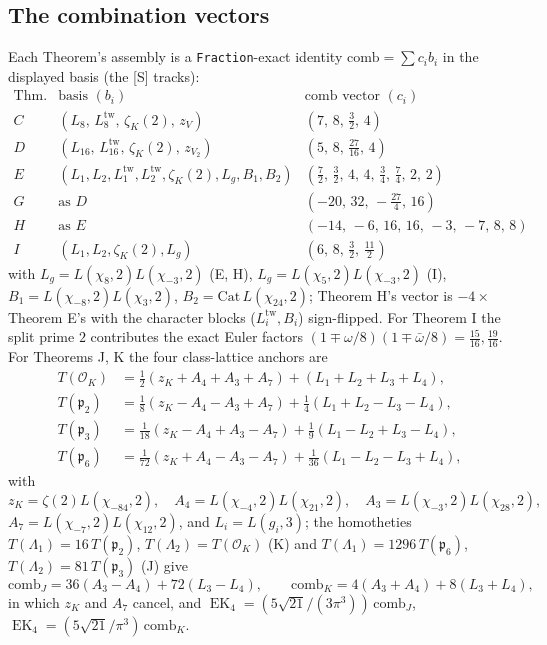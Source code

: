 \documentclass[11pt]{article}
\newcommand{\OO}{\mathcal{O}}
\DeclareMathOperator{\EK}{EK}
\theoremstyle{definition}
\theoremstyle{remark}
\begin{document}
\subsection{The combination vectors}\label{app:comb}

Each Theorem's assembly is a \texttt{Fraction}-exact identity
$\mathrm{comb}=\sum c_i b_i$ in the displayed basis (the [S] tracks):
\[
\begin{array}{c|l|l}
\text{Thm.} & \text{basis }(b_i) & \text{comb vector }(c_i)\\
\hline
C & (L_8,\,L_8^{\mathrm{tw}},\,\zeta_K(2),\,z_V) &
    (7,\,8,\,\tfrac32,\,4)\\
D & (L_{16},\,L_{16}^{\mathrm{tw}},\,\zeta_K(2),\,z_{V_2}) &
    (5,\,8,\,\tfrac{27}{16},\,4)\\
E & (L_1,L_2,L_1^{\mathrm{tw}},L_2^{\mathrm{tw}},\zeta_K(2),L_g,B_1,B_2)
  & (\tfrac72,\,\tfrac32,\,4,\,4,\,\tfrac34,\,\tfrac74,\,2,\,2)\\
G & \text{as }D & (-20,\,32,\,-\tfrac{27}{4},\,16)\\
H & \text{as }E & (-14,\,-6,\,16,\,16,\,-3,\,-7,\,8,\,8)\\
I & (L_1,L_2,\zeta_K(2),L_g) & (6,\,8,\,\tfrac32,\,\tfrac{11}{2})
\end{array}
\]
with $L_g=L(\chi_8,2)L(\chi_{-3},2)$ (E, H),
$L_g=L(\chi_5,2)L(\chi_{-3},2)$ (I),
$B_1=L(\chi_{-8},2)L(\chi_3,2)$, $B_2=\mathrm{Cat}\,L(\chi_{24},2)$;
Theorem H's vector is $-4\times$Theorem E's with the character blocks
($L_i^{\mathrm{tw}},B_i$) sign-flipped. For Theorem I the split prime
$2$ contributes the exact Euler factors
$(1\mp\omega/8)(1\mp\bar\omega/8)=\tfrac{15}{16},\tfrac{19}{16}$.
For Theorems J, K the four class-lattice anchors are
\begin{align*}
  T(\OO_K)&=\tfrac12(z_K+A_4+A_3+A_7)+(L_1+L_2+L_3+L_4),\\
  T(\mathfrak p_2)&=\tfrac18(z_K-A_4-A_3+A_7)+\tfrac14(L_1+L_2-L_3-L_4),\\
  T(\mathfrak p_3)&=\tfrac1{18}(z_K-A_4+A_3-A_7)+\tfrac19(L_1-L_2+L_3-L_4),\\
  T(\mathfrak p_6)&=\tfrac1{72}(z_K+A_4-A_3-A_7)+\tfrac1{36}(L_1-L_2-L_3+L_4),
\end{align*}
with
\[
  z_K=\zeta(2)L(\chi_{-84},2),\quad
  A_4=L(\chi_{-4},2)L(\chi_{21},2),\quad
  A_3=L(\chi_{-3},2)L(\chi_{28},2),
\]
$A_7=L(\chi_{-7},2)L(\chi_{12},2)$, and
$L_i=L(g_i,3)$; the homotheties
$T(\Lambda_1)=16\,T(\mathfrak p_2)$, $T(\Lambda_2)=T(\OO_K)$ (K) and
$T(\Lambda_1)=1296\,T(\mathfrak p_6)$, $T(\Lambda_2)=81\,T(\mathfrak
p_3)$ (J) give
\[
  \mathrm{comb}_J=36(A_3-A_4)+72(L_3-L_4),\qquad
  \mathrm{comb}_K=4(A_3+A_4)+8(L_3+L_4),
\]
in which $z_K$ and $A_7$ cancel, and
$\EK_4=(5\sqrt{21}/(3\pi^3))\,\mathrm{comb}_J$,
$\EK_4=(5\sqrt{21}/\pi^3)\,\mathrm{comb}_K$.
\end{document}

